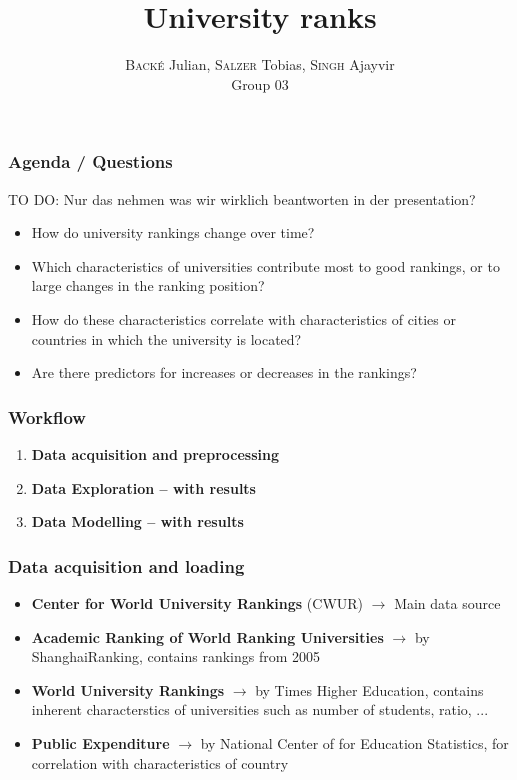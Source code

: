 \documentclass[mathserif,notheorems,11pt]{beamer}
\title{\textbf{University ranks}}
\author{\textsc{Back\'{e}} Julian, \textsc{Salzer} Tobias, \textsc{Singh} Ajayvir\\
Group 03}
\date{}
\begin{document}
\maketitle
\linespread{1.2}




\begin{frame} 
\frametitle{Agenda / Questions}
TO DO: Nur das nehmen was wir wirklich beantworten in der presentation?
\begin{itemize}
	\item How do university rankings change over time? 
	
	\item Which characteristics of universities contribute most to good rankings, or to large changes in the ranking position? 
	
	\item How do these characteristics correlate with characteristics of cities or countries in which the university is
	located? 
	
	\item Are there predictors for increases or decreases in the rankings?
\end{itemize}

\end{frame}

\begin{frame} 
\frametitle{Workflow}

\begin{enumerate}
\item \textbf{Data acquisition and preprocessing}

\item \textbf{Data Exploration -- with results}

\item \textbf{Data Modelling -- with results}
\end{enumerate}
\end{frame}


\begin{frame} 
\frametitle{Data acquisition and loading}
\begin{itemize}
	\item \textbf{Center for World University Rankings} (CWUR) $\rightarrow$ Main data source
	\item \textbf{Academic Ranking of World Ranking Universities} $\rightarrow$ by ShanghaiRanking, contains rankings from 2005
	\item \textbf{World University Rankings } $\rightarrow$ by Times Higher Education, contains inherent characterstics of universities such as number of students, ratio, ...
	\item \textbf{Public Expenditure} $\rightarrow$ by National Center of for Education Statistics, for correlation with characteristics of country

\end{itemize}

\end{frame}
\end{document}
